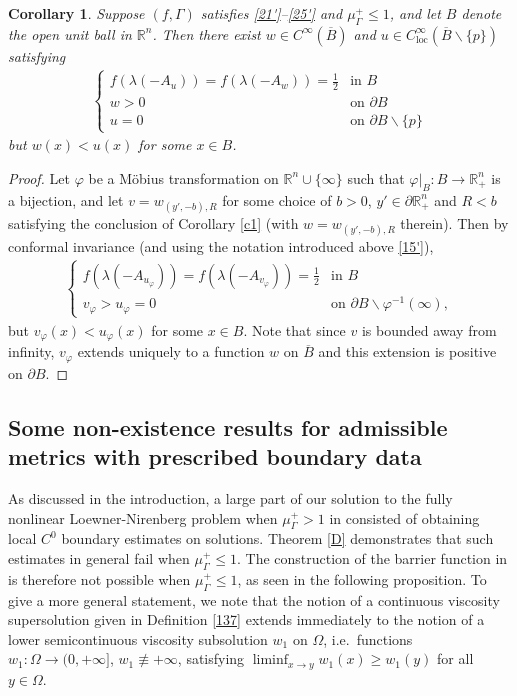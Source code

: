 \documentclass[12pt]{article}
\numberwithin{equation}{section}
\theoremstyle{plain}
\newtheorem{cor}[thm]{Corollary}
\theoremstyle{definition}
\renewcommand{\phi}{\varphi}
\begin{document}
\begin{appendices}
\begin{cor}
	Suppose $(f,\Gamma)$ satisfies \eqref{21'}--\eqref{25'} and $\mu_\Gamma^+ \leq 1$, and let $B$ denote the open unit ball in $\mathbb{R}^n$. Then there exist $w\in C^\infty(\overline{B})$ and $u\in C^{\infty}_{\operatorname{loc}}(\overline{B}\backslash\{p\})$ satisfying
	\begin{align*}
	\begin{cases}f(\lambda(-A_u)) = f(\lambda(-A_w)) = \frac{1}{2} & \text{in }B \\
	w > 0 & \text{on }\partial B \\
	u = 0 & \text{on }\partial B \backslash\{p\}
	\end{cases}
	\end{align*}
	but $w(x) < u(x)$ for some $x\in B$. 
\end{cor}
\begin{proof}
	Let $\phi$ be a M\"obius transformation on $\mathbb{R}^n\cup\{\infty\}$ such that $\phi|_B:B\rightarrow\mathbb{R}_+^n$ is a bijection, and let $v = w_{(y',-b),R}$ for some choice of $b>0$, $y' \in\partial\mathbb{R}_+^n$ and $R<b$ satisfying the conclusion of Corollary \ref{c1} (with $w=w_{(y',-b),R}$ therein). Then by conformal invariance (and using the notation introduced above \eqref{15'}), 
	\begin{align*}
	\begin{cases}
	f(\lambda(-A_{u_\phi})) = f(\lambda(-A_{v_\phi})) = \frac{1}{2} & \text{in }B \\
	v_\phi > u_\phi = 0 & \text{on }\partial B\backslash\phi^{-1}(\infty),
	\end{cases}
	\end{align*}
	but $v_\phi(x) < u_\phi(x)$ for some $x\in B$. Note that since $v$ is bounded away from infinity, $v_\phi$ extends uniquely to a function $w$ on $\overline{B}$ and this extension is positive on $\partial B$. 
\end{proof}

\subsection{Some non-existence results for admissible metrics with prescribed boundary data}

As discussed in the introduction, a large part of our solution to the fully nonlinear Loewner-Nirenberg problem when $\mu_\Gamma^+>1$ in \cite{DN23} consisted of obtaining local $C^0$ boundary estimates on solutions. Theorem \ref{D} demonstrates that such estimates in general fail when $\mu_\Gamma^+ \leq 1$. The construction of the barrier function in \cite[Proposition 1.1]{DN23} is therefore not possible when $\mu_\Gamma^+ \leq 1$, as seen in the following proposition. To give a more general statement, we note that the notion of a continuous viscosity supersolution given in Definition \ref{137} extends immediately to the notion of a lower semicontinuous viscosity subsolution $w_1$ on $\Omega$, i.e.~functions $w_1:\Omega\rightarrow(0,+\infty]$, $w_1\not\equiv+\infty$, satisfying $\liminf_{x\rightarrow y}w_1(x)\geq w_1(y)$ for all $y\in\Omega$. 



\end{appendices}
\end{document}
